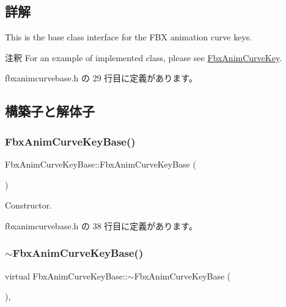 \subsection{詳解}
This is the base class interface for the F\+BX animation curve keys.

\begin{DoxyRemark}{注釈}
For an example of implemented class, please see \hyperlink{class_fbx_anim_curve_key}{Fbx\+Anim\+Curve\+Key}. 
\end{DoxyRemark}


 fbxanimcurvebase.\+h の 29 行目に定義があります。



\subsection{構築子と解体子}
\mbox{\label{class_fbx_anim_curve_key_base_a76d982fc9fe4888f2db2e8d4bb5d4f2f}} 
\subsubsection{\texorpdfstring{Fbx\+Anim\+Curve\+Key\+Base()}{FbxAnimCurveKeyBase()}}
{\footnotesize\ttfamily Fbx\+Anim\+Curve\+Key\+Base\+::\+Fbx\+Anim\+Curve\+Key\+Base (\begin{DoxyParamCaption}{ }\end{DoxyParamCaption})\hspace{0.3cm}{\ttfamily [inline]}}

Constructor. 

 fbxanimcurvebase.\+h の 38 行目に定義があります。

\mbox{\label{class_fbx_anim_curve_key_base_a2f773ce4bba07ee0f92f9cb9b5f3233b}} 
\subsubsection{\texorpdfstring{$\sim$\+Fbx\+Anim\+Curve\+Key\+Base()}{~FbxAnimCurveKeyBase()}}
{\footnotesize\ttfamily virtual Fbx\+Anim\+Curve\+Key\+Base\+::$\sim$\+Fbx\+Anim\+Curve\+Key\+Base (\begin{DoxyParamCaption}{ }\end{DoxyParamCaption})\hspace{0.3cm}{\ttfamily [inline]}, {\ttfamily [virtual]}}

